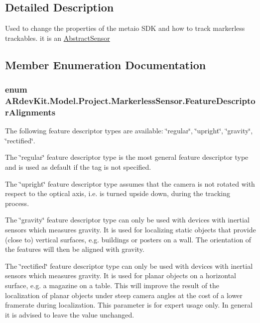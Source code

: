 \subsection{Detailed Description}
Used to change the properties of the metaio S\-D\-K and how to track markerless trackables. it is an \hyperlink{class_a_rdev_kit_1_1_model_1_1_project_1_1_abstract_sensor}{Abstract\-Sensor} 



\subsection{Member Enumeration Documentation}
\hypertarget{class_a_rdev_kit_1_1_model_1_1_project_1_1_markerless_sensor_a1c0b341ee16aa03d68b67714f1cfca53}{
\subsubsection[{Feature\-Descriptor\-Alignments}]{\setlength{\rightskip}{0pt plus 5cm}enum {\bf A\-Rdev\-Kit.\-Model.\-Project.\-Markerless\-Sensor.\-Feature\-Descriptor\-Alignments}}}\label{class_a_rdev_kit_1_1_model_1_1_project_1_1_markerless_sensor_a1c0b341ee16aa03d68b67714f1cfca53}


The following feature descriptor types are available\-: \char`\"{}regular\char`\"{}, \char`\"{}upright\char`\"{}, \char`\"{}gravity\char`\"{}, \char`\"{}rectified\char`\"{}. 


\begin{DoxyItemize}
\item The \char`\"{}regular\char`\"{} feature descriptor type is the most general feature descriptor type and is used as default if the tag is not specified.
\item The \char`\"{}upright\char`\"{} feature descriptor type assumes that the camera is not rotated with respect to the optical axis, i.\-e. is turned upside down, during the tracking process.
\item The \char`\"{}gravity\char`\"{} feature descriptor type can only be used with devices with inertial sensors which measures gravity. It is used for localizing static objects that provide (close to) vertical surfaces, e.\-g. buildings or posters on a wall. The orientation of the features will then be aligned with gravity.
\item The \char`\"{}rectified\char`\"{} feature descriptor type can only be used with devices with inertial sensors which measures gravity. It is used for planar objects on a horizontal surface, e.\-g. a magazine on a table. This will improve the result of the localization of planar objects under steep camera angles at the cost of a lower framerate during localization. This parameter is for expert usage only. In general it is advised to leave the value unchanged. 
\end{DoxyItemize}

